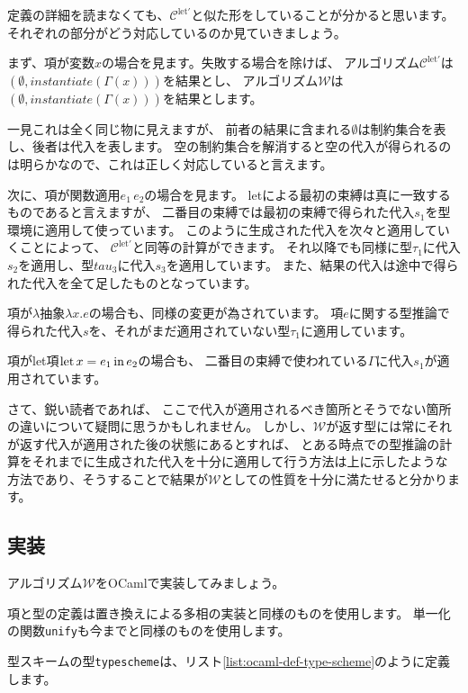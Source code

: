 定義の詳細を読まなくても、$\mathcal C^\mathrm{let'}$と似た形をしていることが分かると思います。
それぞれの部分がどう対応しているのか見ていきましょう。

まず、項が変数$x$の場合を見ます。失敗する場合を除けば、
アルゴリズム$\mathcal C^\mathrm{let'}$は$(\emptyset,\mathit{instantiate}(\Gamma(x)))$を結果とし、
アルゴリズム$\mathcal W$は$(\emptyset, \mathit{instantiate}(\Gamma(x)))$を結果とします。

一見これは全く同じ物に見えますが、
前者の結果に含まれる$\emptyset$は制約集合を表し、後者は代入を表します。
空の制約集合を解消すると空の代入が得られるのは明らかなので、これは正しく対応していると言えます。

次に、項が関数適用$e_1 \, e_2$の場合を見ます。
letによる最初の束縛は真に一致するものであると言えますが、
二番目の束縛では最初の束縛で得られた代入$s_1$を型環境に適用して使っています。
このように生成された代入を次々と適用していくことによって、
$\mathcal C^\mathrm{let'}$と同等の計算ができます。
それ以降でも同様に型$\tau_1$に代入$s_2$を適用し、型$tau_3$に代入$s_3$を適用しています。
また、結果の代入は途中で得られた代入を全て足したものとなっています。

項が$\lambda$抽象$\lambda x. e$の場合も、同様の変更が為されています。
項$e$に関する型推論で得られた代入$s$を、それがまだ適用されていない型$\tau_1$に適用しています。

項がlet項$\mathrm{let} \, x = e_1 \, \mathrm{in} \, e_2$の場合も、
二番目の束縛で使われている$\Gamma$に代入$s_1$が適用されています。

さて、鋭い読者であれば、
ここで代入が適用されるべき箇所とそうでない箇所の違いについて疑問に思うかもしれません。
しかし、$\mathcal W$が返す型には常にそれが返す代入が適用された後の状態にあるとすれば、
とある時点での型推論の計算をそれまでに生成された代入を十分に適用して行う方法は上に示したような
方法であり、そうすることで結果が$\mathcal W$としての性質を十分に満たせると分かります。

\subsection{実装}

アルゴリズム$\mathcal W$をOCamlで実装してみましょう。

項と型の定義は置き換えによる多相の実装と同様のものを使用します。
単一化の関数\texttt{unify}も今までと同様のものを使用します。

型スキームの型\texttt{typescheme}は、リスト\ref{list:ocaml-def-type-scheme}のように定義します。

